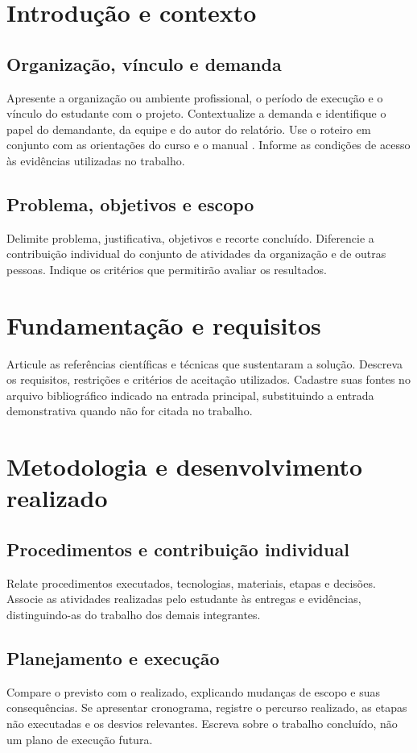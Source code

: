 \chapter{Introdução e contexto}
\section{Organização, vínculo e demanda}
Apresente a organização ou ambiente profissional, o período de execução e
o vínculo do estudante com o projeto. Contextualize a demanda e identifique
o papel do demandante, da equipe e do autor do relatório. Use o roteiro em
conjunto com as orientações do curso e o manual .
Informe as condições de acesso às evidências utilizadas no trabalho.

\section{Problema, objetivos e escopo}
Delimite problema, justificativa, objetivos e recorte concluído. Diferencie
a contribuição individual do conjunto de atividades da organização e de
outras pessoas. Indique os critérios que permitirão avaliar os resultados.

\chapter{Fundamentação e requisitos}
Articule as referências científicas e técnicas que sustentaram a solução.
Descreva os requisitos, restrições e critérios de aceitação utilizados.
Cadastre suas fontes no arquivo bibliográfico indicado na entrada principal,
substituindo a entrada demonstrativa quando não for citada no trabalho.

\chapter{Metodologia e desenvolvimento realizado}
\section{Procedimentos e contribuição individual}
Relate procedimentos executados, tecnologias, materiais, etapas e decisões.
Associe as atividades realizadas pelo estudante às entregas e evidências,
distinguindo-as do trabalho dos demais integrantes.

\section{Planejamento e execução}
Compare o previsto com o realizado, explicando mudanças de escopo e suas
consequências. Se apresentar cronograma, registre o percurso realizado,
as etapas não executadas e os desvios relevantes. Escreva sobre o trabalho
concluído, não um plano de execução futura.

